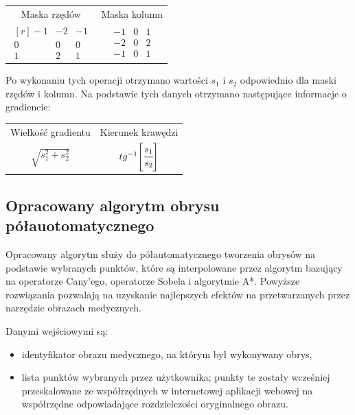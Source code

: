 \documentclass[a4paper,11pt,twoside,openright]{report}
\theoremstyle{definition}
\begin{document}
\begin{table}[h!]
\centering
\begin{tabular} { c c }
  Maska rzędów & Maska kolumn \\
$
\begin{matrix*}[r]
-1 & -2 & -1 \\
0 & 0 & 0 \\
1 & 2 & 1
\end{matrix*}$
&
$\begin{matrix}
-1 & 0 & 1 \\
-2 & 0 & 2 \\
-1 & 0 & 1
\end{matrix}$
\end{tabular}
\end{table}

Po wykonaniu tych operacji otrzymano wartości $s_1$ i $s_2$ odpowiednio dla maski
rzędów i kolumn. Na podstawie tych danych otrzymano następujące informacje o gradiencie:
\begin{table}[h!]
\centering
\begin{tabular} { c c }
  Wielkość gradientu & Kierunek krawędzi \\
$\sqrt{s_1^2 + s_2^2}$ & $tg^{-1} \Bigg[ {\cfrac{s_1}{s_2}} \Bigg]$
\end{tabular}
\end{table}

\subsection {Opracowany algorytm obrysu półauotomatycznego}

Opracowany algorytm służy do półautomatycznego tworzenia obrysów na podstawie wybranych punktów,
które są interpolowane przez algorytm bazujący na operatorze Cany'ego, operatorze Sobela i algorytmie A*.
Powyższe rozwiązania pozwalają na uzyskanie najlepszych efektów na przetwarzanych
przez narzędzie obrazach medycznych.

Danymi wejściowymi są:
\begin{itemize}[noitemsep]
\item {identyfikator obrazu medycznego, na którym był wykonywany obrys,}
\item {lista punktów wybranych przez użytkownika; punkty te zostały wcześniej
przeskalowane ze współrzędnych w internetowej aplikacji webowej
na współrzędne odpowiadające rozdzielczości oryginalnego obrazu.}
\end{itemize}
\end{document}
